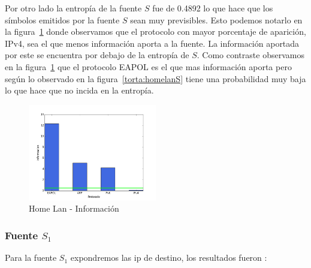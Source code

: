 \documentclass[final,inline,narroweqnarray,a4paper]{ieee}
\begin{document}
Por otro lado la entropía de la fuente $S$ fue de 0.4892 lo que hace que los símbolos emitidos por la fuente $S$ sean muy previsibles. Esto podemos notarlo en la figura~\ref{histo:homelanS} donde observamos que el protocolo con mayor porcentaje de aparición, IPv4,  sea el que menos información aporta a la fuente. La información aportada por este se encuentra por debajo de la entropía de $S$. Como contraste observamos en la figura~\ref{histo:homelanS} que el protocolo EAPOL es el que mas información aporta pero según lo observado en la figura~\ref{torta:homelanS} tiene una probabilidad muy baja lo que hace que no incida en la entropía.

\begin{figure}[H]
    \begin{center}
        \includegraphics[width=0.5\textwidth]{plot/homelanS-bar.png}
        \caption{Home Lan - Información}
        \label{histo:homelanS}
    \end{center}
\end{figure}

\subsubsection{Fuente $S_1$}
Para la fuente $S_1$ expondremos las ip de destino, los resultados fueron :
\end{document}
